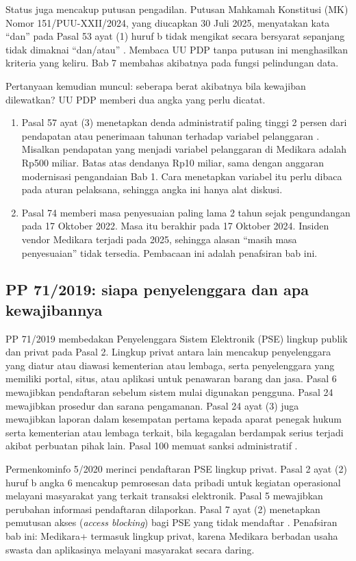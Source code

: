 Status juga mencakup putusan pengadilan. Putusan Mahkamah Konstitusi (MK) Nomor
151/PUU-XXII/2024, yang diucapkan 30 Juli 2025, menyatakan kata ``dan'' pada Pasal 53 ayat (1)
huruf b tidak mengikat secara bersyarat sepanjang tidak dimaknai ``dan/atau'' \cite{c07-mk151}.
Membaca UU PDP tanpa putusan ini menghasilkan kriteria yang keliru. Bab 7 membahas akibatnya
pada fungsi pelindungan data.

Pertanyaan kemudian muncul: seberapa berat akibatnya bila kewajiban dilewatkan? UU PDP memberi
dua angka yang perlu dicatat.
\begin{enumerate}
  \item Pasal 57 ayat (3) menetapkan denda administratif paling tinggi 2 persen dari pendapatan
  atau penerimaan tahunan terhadap variabel pelanggaran \cite{uu27-2022-pdp}. Misalkan
  pendapatan yang menjadi variabel pelanggaran di Medikara adalah Rp500 miliar. Batas atas
  dendanya Rp10 miliar, sama dengan anggaran modernisasi pengandaian Bab 1. Cara menetapkan
  variabel itu perlu dibaca pada aturan pelaksana, sehingga angka ini hanya alat diskusi.
  \item Pasal 74 memberi masa penyesuaian paling lama 2 tahun sejak pengundangan pada 17 Oktober
  2022. Masa itu berakhir pada 17 Oktober 2024. Insiden vendor Medikara terjadi pada 2025,
  sehingga alasan ``masih masa penyesuaian'' tidak tersedia. Pembacaan ini adalah penafsiran
  bab ini.
\end{enumerate}

\subsection*{PP 71/2019: siapa penyelenggara dan apa kewajibannya}

PP 71/2019 membedakan Penyelenggara Sistem Elektronik (PSE) lingkup publik dan privat pada
Pasal 2. Lingkup privat antara lain mencakup penyelenggara yang diatur atau diawasi kementerian
atau lembaga, serta penyelenggara yang memiliki portal, situs, atau aplikasi untuk penawaran
barang dan jasa. Pasal 6 mewajibkan pendaftaran sebelum sistem mulai digunakan pengguna. Pasal
24 mewajibkan prosedur dan sarana pengamanan. Pasal 24 ayat (3) juga mewajibkan laporan dalam
kesempatan pertama kepada aparat penegak hukum serta kementerian atau lembaga terkait, bila
kegagalan berdampak serius terjadi akibat perbuatan pihak lain. Pasal 100 memuat sanksi
administratif \cite{pp71-2019-pste}.

Permenkominfo 5/2020 merinci pendaftaran PSE lingkup privat. Pasal 2 ayat (2) huruf b angka 6
mencakup pemrosesan data pribadi untuk kegiatan operasional melayani masyarakat yang terkait
transaksi elektronik. Pasal 5 mewajibkan perubahan informasi pendaftaran dilaporkan. Pasal 7
ayat (2) menetapkan pemutusan akses (\textit{access blocking}) bagi PSE yang tidak mendaftar
\cite{c03-pm5-2020}. Penafsiran bab ini: Medikara+ termasuk lingkup privat, karena Medikara
berbadan usaha swasta dan aplikasinya melayani masyarakat secara daring.

